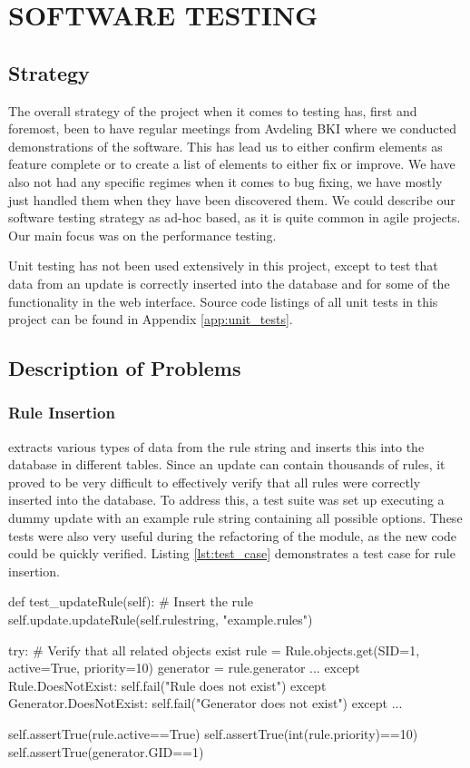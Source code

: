 \chapter{SOFTWARE TESTING}

\section{Strategy}
The overall strategy of the project when it comes to testing has, first and
foremost, been to have regular meetings from Avdeling BKI where we conducted
demonstrations of the software. This has lead us to either confirm elements as
feature complete or to create a list of elements to either fix or improve. We
have also not had any specific regimes when it comes to bug fixing, we have
mostly just handled them when they have been discovered them. We could describe
our software testing strategy as ad-hoc based, as it is quite common in agile
projects. Our main focus was on the performance testing.

Unit testing has not been used extensively in this project, except to test that
data from an update is correctly inserted into the database and for some of the
functionality in the web interface. Source code listings of all unit tests in
this project can be found in Appendix \ref{app:unit_tests}.

\section{Description of Problems}

\subsection{Rule Insertion}
\snowman{} extracts various types of data from the rule string and inserts
this into the database in different tables. Since an update can contain
thousands of rules, it proved to be very difficult to effectively verify that
all rules were correctly inserted into the database. To address this, a test suite was set
up executing a dummy update with an example rule string containing all
possible options. These tests were also very useful during the refactoring of
the  module, as the new code could be quickly verified.
Listing \ref{lst:test_case} demonstrates a test case for rule insertion.

\begin{python}[caption=Example test case,label=lst:test_case]
def test_updateRule(self):
  # Insert the rule
  self.update.updateRule(self.rulestring, "example.rules")

  try:
    # Verify that all related objects exist
    rule = Rule.objects.get(SID=1, active=True, priority=10)
    generator = rule.generator
    ...
  except Rule.DoesNotExist:
    self.fail("Rule does not exist")
  except Generator.DoesNotExist:
    self.fail("Generator does not exist")
  except ...

  self.assertTrue(rule.active==True)
  self.assertTrue(int(rule.priority)==10)
  self.assertTrue(generator.GID==1)
\end{python}


